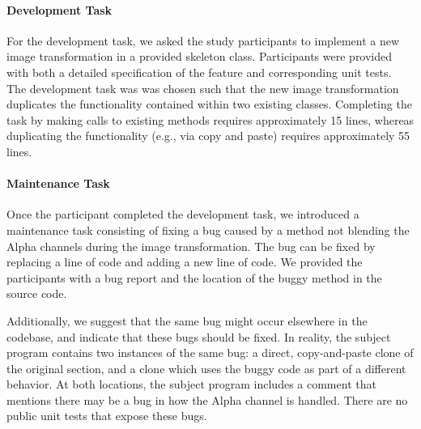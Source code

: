 \documentclass[nocopyrightspace,10pt]{sigplanconf}
\begin{document}
\paragraph{Development Task}

For the development task, we asked the study participants to implement
a new image transformation in a provided skeleton class. Participants
were provided with both a detailed specification of the feature and
corresponding unit tests. The development task was was chosen such
that the new image transformation duplicates the functionality
contained within two existing classes. Completing the task by making
calls to existing methods requires approximately 15 lines, whereas
duplicating the functionality (e.g., via copy and paste) requires
approximately 55 lines.

\paragraph{Maintenance Task}

Once the participant completed the development task, we introduced a
maintenance task consisting of fixing a bug caused by a method not
blending the Alpha channels during the image transformation. The bug
can be fixed by replacing a line of code and adding a new line of
code. We provided the participants with a bug report and the location
of the buggy method in the source code.

Additionally, we suggest that the same bug might occur elsewhere in
the codebase, and indicate that these bugs should be fixed.  In
reality, the subject program contains two instances of the same bug: a
direct, copy-and-paste clone of the original section, and a clone
which uses the buggy code as part of a different behavior.  At both
locations, the subject program includes a comment that mentions there
may be a bug in how the Alpha channel is handled. There are no public
unit tests that expose these bugs.
\end{document}
